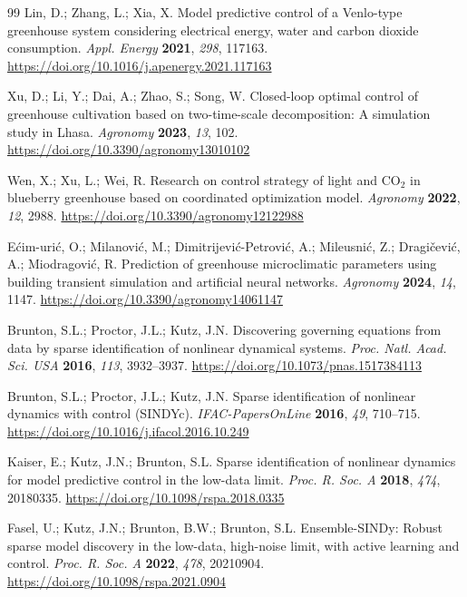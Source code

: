\begin{thebibliography}{99}
Lin, D.; Zhang, L.; Xia, X. Model predictive control of a Venlo-type greenhouse system
considering electrical energy, water and carbon dioxide consumption. \textit{Appl. Energy}
\textbf{2021}, \textit{298}, 117163. \url{https://doi.org/10.1016/j.apenergy.2021.117163}

Xu, D.; Li, Y.; Dai, A.; Zhao, S.; Song, W. Closed-loop optimal control of greenhouse
cultivation based on two-time-scale decomposition: A simulation study in Lhasa.
\textit{Agronomy} \textbf{2023}, \textit{13}, 102.
\url{https://doi.org/10.3390/agronomy13010102}

Wen, X.; Xu, L.; Wei, R. Research on control strategy of light and CO$_2$ in blueberry
greenhouse based on coordinated optimization model. \textit{Agronomy} \textbf{2022},
\textit{12}, 2988. \url{https://doi.org/10.3390/agronomy12122988}

E{\'c}im-{\DJ}uri{\'c}, O.; Milanovi{\'c}, M.; Dimitrijevi{\'c}-Petrovi{\'c}, A.;
Mileusni{\'c}, Z.; Dragi{\v{c}}evi{\'c}, A.; Miodragovi{\'c}, R. Prediction of greenhouse
microclimatic parameters using building transient simulation and artificial neural networks.
\textit{Agronomy} \textbf{2024}, \textit{14}, 1147.
\url{https://doi.org/10.3390/agronomy14061147}

Brunton, S.L.; Proctor, J.L.; Kutz, J.N. Discovering governing equations from data by sparse
identification of nonlinear dynamical systems. \textit{Proc. Natl. Acad. Sci. USA}
\textbf{2016}, \textit{113}, 3932--3937. \url{https://doi.org/10.1073/pnas.1517384113}

Brunton, S.L.; Proctor, J.L.; Kutz, J.N. Sparse identification of nonlinear dynamics with
control (SINDYc). \textit{IFAC-PapersOnLine} \textbf{2016}, \textit{49}, 710--715.
\url{https://doi.org/10.1016/j.ifacol.2016.10.249}

Kaiser, E.; Kutz, J.N.; Brunton, S.L. Sparse identification of nonlinear dynamics for model
predictive control in the low-data limit. \textit{Proc. R. Soc. A} \textbf{2018},
\textit{474}, 20180335. \url{https://doi.org/10.1098/rspa.2018.0335}

Fasel, U.; Kutz, J.N.; Brunton, B.W.; Brunton, S.L. Ensemble-SINDy: Robust sparse model
discovery in the low-data, high-noise limit, with active learning and control.
\textit{Proc. R. Soc. A} \textbf{2022}, \textit{478}, 20210904.
\url{https://doi.org/10.1098/rspa.2021.0904}


\end{thebibliography}
